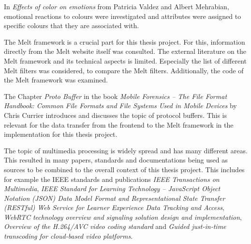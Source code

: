 \documentclass[../MasterThesis.tex]{subfiles}
\begin{document}
\begin{description}[font=\color{RedViolet!80!black}, style=nextline]
		
		In \textit{Effects of color on emotions} from Patricia Valdez and Albert Mehrabian, emotional reactions to colours were investigated and attributes were assigned to specific colours that they are associated with.~\cite{colour2}
	
		
		
		\item[Melt framework]
		
		
		The Melt framework is a crucial part for this thesis project. For this, information directly from the Melt website itself was consulted. The external literature on the Melt framework and its technical aspects is limited. Especially the list of different Melt filters was considered, to compare the Melt filters. Additionally, the code of the Melt framework was examined.~\cite{melt, melt_filters, melt_code}

		
	
		
		
		\item[Protocol buffer] 
		
		The Chapter \textit{Proto Buffer} in the book \textit{Mobile Forensics -- The File Format Handbook: Common File Formats and File Systems Used in Mobile Devices} by Chris Currier introduces and discusses the topic of protocol buffers. This is relevant for the data transfer from the frontend to the Melt framework in the implementation for this thesis project.~\cite{protobuffer}
		
		
		
		
				
		
		
		\item[Multimedia processing] 
		
		The topic of multimedia processing is widely spread and has many different areas. This resulted in many papers, standards and documentations being used as sources to be combined to the overall context of this thesis project. This includes for example the IEEE standards and publications \textit{IEEE Transactions on Multimedia}, \textit{IEEE Standard for Learning Technology -- JavaScript Object Notation (JSON) Data Model Format and Representational State Transfer (RESTful) Web Service for Learner Experience Data Tracking and Access}, \textit{WebRTC technology overview and signaling solution design and implementation}, \textit{Overview of the H.264/AVC video coding standard} and \textit{Guided just-in-time transcoding for cloud-based video platforms}.~\cite{transcoding, IEEE_Rest, webrtc, h264, JIT_IEEE}
		

\end{description}
\end{document}
